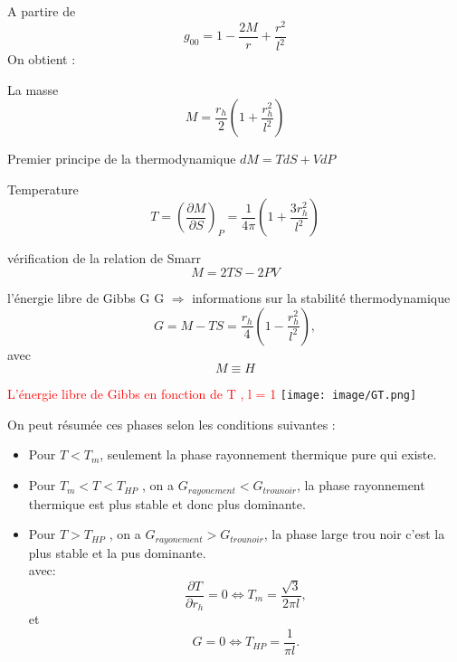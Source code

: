 \documentclass{beamer}
\begin{document}
\begin{frame}
	A partire de $$g_{00}=1-\dfrac{2M}{r}+\dfrac{r^{2}}{l^{2}}$$
	On obtient :
	\begin{block}{La masse}
	$$	M=\dfrac{r_{h}}{2}(1+\dfrac{r_{h}^{2}}{l^{2}})$$
		
	\end{block}
	\begin{block}{ Premier principe de la thermodynamique }
$	dM=TdS+VdP $
	
\end{block}
\begin{block}{ Temperature }
$$T=(\dfrac{\partial M}{\partial S})_{P}=\dfrac{1}{4\pi}(1+\dfrac{3r_{h}^{2}}{l^{2}})$$
	
\end{block}
	\begin{block}{vérification de la relation de Smarr}
		$$M=2TS-2PV$$
	
\end{block}
\end{frame}
\begin{frame}
\begin{block}{l'énergie libre de Gibbs G }
G $\Rightarrow$	informations sur la stabilité thermodynamique
$$G=M-TS=\dfrac{r_{h}}{4}(1-\dfrac{r_{h}^{2}}{l^{2}}),$$
avec $$M\equiv H$$
\end{block}
\textcolor{red}{L'énergie libre de Gibbs en fonction de T , l = 1}
	\texttt{[image: image/GT.png]}
\end{frame}
\begin{frame}
On peut résumée ces phases selon les conditions suivantes :
	
\begin{itemize}
	\item  Pour $ T < T_{m}$, seulement la phase rayonnement thermique pure qui existe.
	
	\item Pour $T_{m} < T < T_{HP}$ , on a $G_{rayonement} < G_{trounoir}$, la phase rayonnement thermique est
	plus stable et donc plus dominante.
	
	\item Pour $T > T_{HP}$ , on a $G_{rayonement} > G_{trounoir}$, la phase large trou noir c'est la plus stable et la pus dominante.\\
	avec:
	$$\dfrac{\partial T}{\partial r_{h}}=0 \Leftrightarrow T_{m}=\dfrac{\sqrt{3}}{2\pi l},$$
	et
	$$G=0 \Leftrightarrow T_{HP}=\dfrac{1}{\pi l}.$$
	
	
\end{itemize}

\end{frame}
\end{document}
